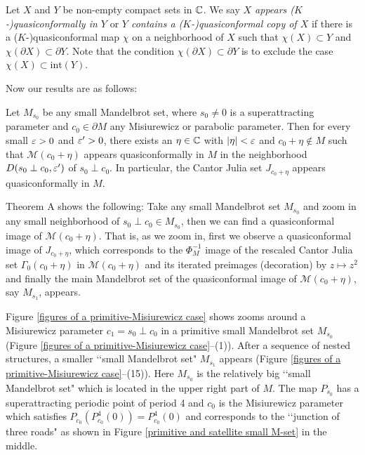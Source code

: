 \begin{defn}
Let $X$ and $Y$ be non-empty compact sets in $\mathbb C$. We say {\it $X$ 
appears ($K$-)quasiconformally in $Y$} or {\it $Y$ contains a 
($K$-)quasiconformal copy of $X$} if there is a ($K$-)quasiconformal map 
$\chi$ on a neighborhood of $X$ such that
$\chi(X) \subset Y$ and $\chi(\partial X) \subset \partial Y$. Note that
the condition $\chi(\partial X) \subset \partial Y$ is to exclude the case
$\chi(X) \subset \text{int}(Y)$.
\end{defn}


Now our results are as follows:


\begin{thmA*}
Let $M_{s_0}$ be any small Mandelbrot set, where $s_0 \ne 0$ is a
superattracting parameter and $c_0 \in \partial M$ 
any Misiurewicz or parabolic parameter. Then
for every small $\varepsilon > 0$ and $\varepsilon' > 0$, there exists an $\eta \in \mathbb C$ 
with $|\eta| < \varepsilon$ and
$c_0+\eta \notin M$ such that
${\mathcal M}(c_0+\eta)$ appears quasiconformally in $M$ in the neighborhood
$D(s_0 \perp c_0, \varepsilon')$ of $s_0 \perp c_0$. In particular, the Cantor
Julia set $J_{c_0+\eta}$ appears quasiconformally in $M$.
\end{thmA*}


\noin
Theorem A shows the following: Take any small Mandelbrot set $M_{s_0}$
and zoom in any small neighborhood of $s_0 \perp c_0 \in M_{s_0}$, then we 
can find a quasiconformal image of ${\mathcal M}(c_0+\eta)$. That is, as we 
zoom in, first we observe a quasiconformal image of $J_{c_0+\eta}$, which 
corresponds to the $\Phi_M^{-1}$ image of the rescaled Cantor Julia set 
$\Gamma_0(c_0+\eta)$ in ${\mathcal M}(c_0+\eta)$ and its iterated preimages
(decoration) by $z \mapsto z^2$ and finally the main Mandelbrot set of the
quasiconformal image of ${\mathcal M}(c_0+\eta)$, say $M_{s_1}$, appears.


Figure \ref{figures of a primitive-Misiurewicz case} shows zooms around
a Misiurewicz parameter $c_1 = s_0 \perp c_0$ in a primitive small 
Mandelbrot set $M_{s_0}$ 
(Figure \ref{figures of a primitive-Misiurewicz case}--(1)). 
After a sequence of nested structures, a smaller 
\lq\lq small Mandelbrot set" $M_{s_1}$ appears 
(Figure \ref{figures of a primitive-Misiurewicz case}--(15)). 
Here $M_{s_0}$ is the relatively big \lq\lq small 
Mandelbrot set" which is located in the upper right part of $M$. The map 
$P_{s_0}$ has a superattracting periodic point of period 4 and $c_0$ is the 
Misiurewicz parameter which satisfies $P_{c_0}(P_{c_0}^4(0)) = P_{c_0}^4(0)$
and corresponds to the \lq\lq junction of three roads" as shown in
Figure \ref{primitive and satellite small M-set} in the middle.






